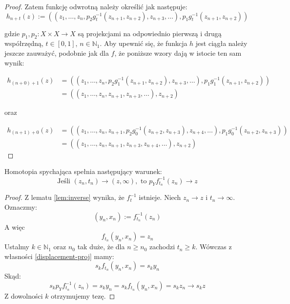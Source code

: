 \begin{thm}
\begin{proof}
    Zatem funkcję odwrotną należy określić jak następuje:
    \[h_{n+t}(z) := ((z_1, \ldots, z_n, p_2 g_t^{-1}(z_{n+1}, z_{n+2}), z_{n+3}, \ldots), p_1 g_t^{-1}(z_{n+1}, z_{n+2}))\]
    
    gdzie $p_1, p_2:  X \times X \rightarrow X$ są projekcjami na odpowiednio pierwszą i drugą współrzędną, $t \in [0,1]$, $n \in \mathbb{N}_1$. Aby upewnić się, że funkcja $h$ jest ciągła należy jeszcze zauważyć, podobnie jak dla $f$, że poniższe wzory dają w istocie ten sam wynik:
    
    \begin{align*}
    h_{(n+0)+1}(z) &= ((z_1, \ldots, z_n, p_2 g_1^{-1}(z_{n+1}, z_{n+2}), z_{n+3}, \ldots), p_1 g_1^{-1}(z_{n+1}, z_{n+2})) \\
    &= ((z_1, \ldots, z_n, z_{n+1}, z_{n+3}, \ldots), z_{n+2})
    \end{align*}
    
    oraz
    
    \begin{align*}
    h_{(n+1)+0}(z) &= ((z_1, \ldots, z_n, z_{n+1}, p_2 g_0^{-1}(z_{n+2}, z_{n+3}), z_{n+4}, \ldots), p_1 g_0^{-1}(z_{n+2}, z_{n+3})) \\
    &= ((z_1, \ldots, z_n, z_{n+1}, z_{n+3}, z_{n+4}, \ldots), z_{n+2})
    \end{align*}

  \end{proof}
\end{thm}


\begin{prop}
  Homotopia spychająca spełnia następujący warunek:
  \[\mbox{Jeśli } (z_n, t_n) \rightarrow (z, \infty), \mbox{ to } p_Y f_{t_n}^{-1}(z_n) \rightarrow z\]
  \begin{proof}
    Z lematu \ref{lem:inverse} wynika, że $f_t^{-1}$ istnieje.
    Niech $z_n \rightarrow z$ i $t_n \rightarrow \infty$. Oznaczmy:
    \[(y_n, x_n) := f_{t_n}^{-1}(z_n)\]
    A więc
    \[f_{t_n}(y_n, x_n) = z_n\]
    Ustalmy $k \in \mathbb{N}_1$ oraz $n_0$ tak duże, że dla $n \geq n_0$ zachodzi $t_n \geq k$. Wówczas z własności \ref{displacement-proj} mamy:
    \[s_k f_{t_n}(y_n, x_n) = s_k y_n\]
    Skąd:
    \[s_k p_Y f_{t_n}^{-1}(z_n) = s_k y_n = s_k f_{t_n}(y_n, x_n) = s_k z_n \rightarrow s_k z\]
    Z dowolności $k$ otrzymujemy tezę.
  \end{proof}
\end{prop}

